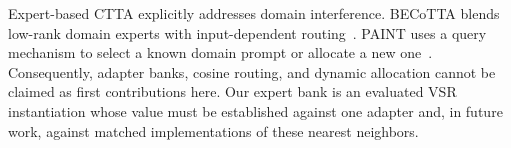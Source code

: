 Expert-based CTTA explicitly addresses domain interference. BECoTTA blends low-rank domain experts with input-dependent routing~\cite{lee2024becotta}. PAINT uses a query mechanism to select a known domain prompt or allocate a new one~\cite{cui2025paint}. Consequently, adapter banks, cosine routing, and dynamic allocation cannot be claimed as first contributions here. Our expert bank is an evaluated VSR instantiation whose value must be established against one adapter and, in future work, against matched implementations of these nearest neighbors.

